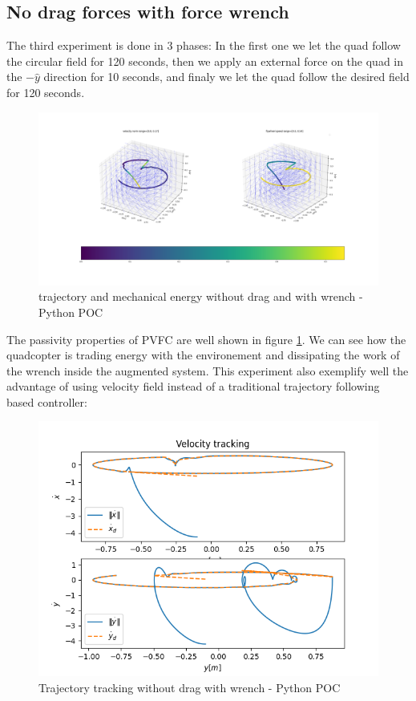 \subsection{No drag forces with force wrench}
The third experiment is done in 3 phases: In the first one we let the quad follow the circular field for 120 seconds, 
then we apply an external force on the quad in the $-\hat{y}$ direction for 10 seconds,
and finaly we let the quad follow the desired field for 120 seconds.
\begin{figure}[h!]
   \centering
   \includegraphics[width=\linewidth]{Images/python-nodrag-wrench.png}
   \caption{trajectory and mechanical energy without drag and with wrench - Python POC }
   \label{fig:pythonnodragwrench}
\end{figure}
The passivity properties of PVFC are well shown in figure \ref{fig:pythonnodragwrench}. We can see how the quadcopter is trading energy with the environement and dissipating the work of the wrench inside the augmented system.
This experiment also exemplify well the advantage of using velocity field instead of a traditional trajectory following based controller:
\begin{figure}[h!]
   \centering
   \includegraphics[width=\linewidth]{Images/velocitytrackingpythonnodragwrench.png}
   \caption{Trajectory tracking without drag with wrench - Python POC }
   \label{fig:trajtracknodragwrench}
\end{figure}
